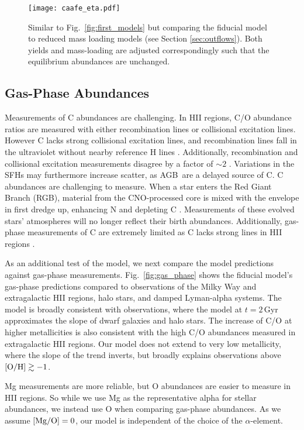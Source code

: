 \documentclass[fleqn,usenatbib]{mnras}
\newcommand{\agb}{AGB}
\newcommand{\sfh}{SFH}
\newcommand{\about}[1]{${\sim} #1$}
\begin{document}
\begin{figure}
    \centering
    \texttt{[image: caafe\_eta.pdf]}
    \caption[Reduced-Outflow Models]{Similar to Fig.~\ref{fig:first_models} but comparing the fiducial model to reduced mass loading models (see Section  \ref{sec:outflows}). Both yields and mass-loading are adjusted correspondingly such that the equilibrium abundances are unchanged. }
    \label{fig:eta}
\end{figure}




\subsection{Gas-Phase Abundances}\label{sec:gas}

Measurements of C abundances are challenging. In HII regions, C/O abundance ratios are measured with either recombination lines or collisional excitation lines. However C lacks strong collisional excitation lines, and recombination lines fall in the ultraviolet without nearby reference H lines \citep{skillman+20}. Additionally, recombination and collisional excitation measurements disagree by a factor of \about{2} \citep{GR07}.
Variations in the \sfh{}s may furthermore increase scatter, as \agb\ are a delayed source of C. C abundances are challenging to measure. When a star enters the Red Giant Branch (RGB), material from the CNO-processed core is mixed with the envelope in first dredge up, enhancing N and depleting C \citep{iben67, vincenzo+21,KL14}. Measurements of these evolved stars'  atmospheres will no longer reflect their birth abundances.  Additionally, gas-phase measurements of C are extremely limited as C lacks strong lines in HII regions \citep{skillman+20}.


As an additional test of the model, we next compare the model predictions against gas-phase measurements. Fig.~\ref{fig:gas_phase} shows the fiducial model's gas-phase predictions compared to observations of the Milky Way and extragalactic HII regions, halo stars, and damped Lyman-alpha systems. The model is broadly consistent with observations, where the model at $t=2$\,Gyr approximates the slope of dwarf galaxies and halo stars. The increase of C/O at higher metallicities is also consistent with the high C/O abundances measured in extragalactic HII regions. 
Our model does not extend to very low metallicity, where the slope of the trend inverts, but broadly explains observations above $\rm [O/H] \gtrsim -1$. 

Mg measurements are more reliable, but O abundances are easier to measure in HII regions. So while we use Mg as the representative alpha for stellar abundances, we instead use O when comparing gas-phase abundances. As we assume ${\rm[Mg/O]}=0$, our model is independent of the choice of the $\alpha$-element.
\end{document}
